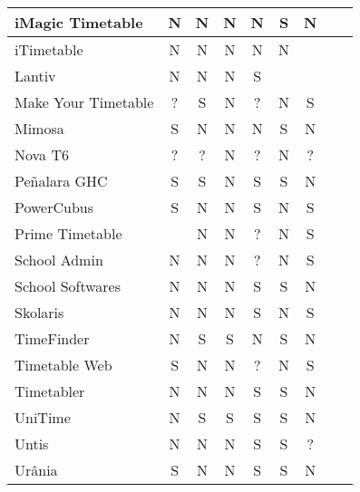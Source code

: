 \documentclass[12pt,a4paper]{article}
\begin{document}
\begin{table}[htb]
\begin{center}
\begin{threeparttable}
{\begin{tabular}{| l | c | c | c | c | c | c | c | c | }
							iMagic Timetable    & N & N & N & N & S & N & \cite{rel_imagic}								\\ \hline %
							iTimetable          & N & N & N & N & N & \tnote{*}& \cite{rel_itimetable}  			\\ \hline %
							Lantiv 				& N & N & N & S & \multicolumn{2}{c|}{\tnote{**}} & \cite{rel_lantiv}\\ \hline %
							Make Your Timetable & ? & S & N & ? & N & S & \cite{rel_makeyourtimetable}	 				\\ \hline %
							Mimosa				& S & N & N & N & S & N & \cite{rel_mimosa}								\\ \hline %
							Nova T6             & ? & ? & N & ? & N & ? & \cite{rel_novat6}								\\ \hline %
							Peñalara GHC		& S & S & N & S & S & N & \cite{rel_penalara}							\\ \hline
							PowerCubus 	    	& S & N & N & S & N & S & \cite{rel_gridclass, rel_powercubus}			\\ \hline
							Prime Timetable     &   & N & N & ? & N & S & \cite{rel_primetimetable}						\\ \hline %
							School Admin		& N & N & N & ? & N & S & \cite{rel_schooladmin}						\\ \hline %
							School Softwares    & N & N & N & S & S & N & \cite{rel_schoolsoftwares} 					\\ \hline
							Skolaris			& N & N & N & S & N & S & \cite{rel_skolaris}							\\ \hline %
							TimeFinder          & N & S & S & N & S & N & \cite{rel_timefinder}							\\ \hline
							Timetable Web 	    & S & N & N & ? & N & S & \cite{rel_timetableweb} 						\\ \hline %
							Timetabler          & N & N & N & S & S & N & \cite{rel_timetabler} 						\\ \hline %
							UniTime  			& N & S & S & S & S & N & \cite{rel_unitime}  							\\ \hline %
							Untis 	 			& N & N & N & S & S & ? & \cite{rel_untis} 								\\ \hline %
							Urânia 		   	 	& S & N & N & S & S & N & \cite{rel_urania} 							\\ \hline %

\end{tabular}}
\end{threeparttable}
\end{center}
\end{table}
\end{document}
